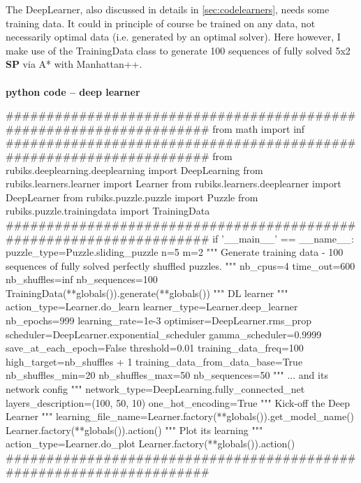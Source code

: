 \label{DLSS}
The DeepLearner, also discussed in details in \ref{sec:codelearners}, needs some training data. It could in principle of course be trained on any data, not necessarily optimal data (i.e. generated by an optimal solver). Here however, I make use of the TrainingData class to generate 100 sequences of fully solved 5x2 \textbf{SP} via A{*} with Manhattan++.


\afblue
\paragraph{}{\textbf{python code -- deep learner}}
\begin{python}
####################################################################
from math import inf
####################################################################
from rubiks.deeplearning.deeplearning import DeepLearning
from rubiks.learners.learner import Learner
from rubiks.learners.deeplearner import DeepLearner
from rubiks.puzzle.puzzle import Puzzle
from rubiks.puzzle.trainingdata import TrainingData
####################################################################
if '__main__' == __name__:
    puzzle_type=Puzzle.sliding_puzzle
    n=5
    m=2
    """ Generate training data - 100 sequences of fully 
    solved perfectly shuffled puzzles. 
    """
    nb_cpus=4
    time_out=600
    nb_shuffles=inf
    nb_sequences=100
    TrainingData(**globals()).generate(**globals())
    """ DL learner """
    action_type=Learner.do_learn
    learner_type=Learner.deep_learner
    nb_epochs=999
    learning_rate=1e-3
    optimiser=DeepLearner.rms_prop
    scheduler=DeepLearner.exponential_scheduler
    gamma_scheduler=0.9999
    save_at_each_epoch=False
    threshold=0.01
    training_data_freq=100
    high_target=nb_shuffles + 1
    training_data_from_data_base=True
    nb_shuffles_min=20
    nb_shuffles_max=50
    nb_sequences=50
    """ ... and its network config """
    network_type=DeepLearning.fully_connected_net
    layers_description=(100, 50, 10)
    one_hot_encoding=True
    """ Kick-off the Deep Learner """
    learning_file_name=Learner.factory(**globals()).get_model_name()
    Learner.factory(**globals()).action()
    """ Plot its learning """
    action_type=Learner.do_plot
    Learner.factory(**globals()).action()
####################################################################
\end{python}
\black

